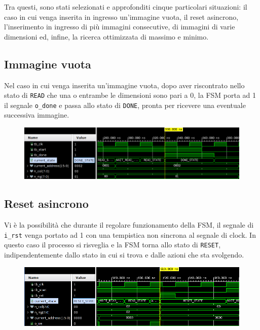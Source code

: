\documentclass[11pt]{article}
\begin{document}
    Tra questi, sono stati selezionati e approfonditi cinque particolari situazioni: il caso in cui venga inserita in ingresso un'immagine vuota, il reset asincrono, l'inserimento in ingresso di più immagini consecutive, di immagini di varie dimensioni ed, infine, la ricerca ottimizzata di massimo e minimo.
    
    
    \subsection{Immagine vuota}
    
        Nel caso in cui venga inserita un'immagine vuota, dopo aver riscontrato nello stato di \texttt{READ} che una o entrambe le dimensioni sono pari a 0, la FSM porta ad 1 il segnale \texttt{o\_done} e passa allo stato di \texttt{DONE}, pronta per ricevere una eventuale successiva immagine.
        
        \begin{figure}[h]
        \centering
        \includegraphics[width=\textwidth]{tb_no_image.png}
        \end{figure}

    \subsection{Reset asincrono}
    
        Vi è la possibilità che durante il regolare funzionamento della FSM, il segnale di \texttt{i\_rst} venga portato ad 1 con una tempistica non sincrona al segnale di clock.
        In questo caso il processo si risveglia e la FSM torna allo stato di \texttt{RESET}, indipendentemente dallo stato in cui si trova e dalle  azioni che sta svolgendo.
        
    
    \begin{figure}[h]
        \centering
        \includegraphics[width=\textwidth]{tb_async_reset.png}
    \end{figure}
    
\end{document}
